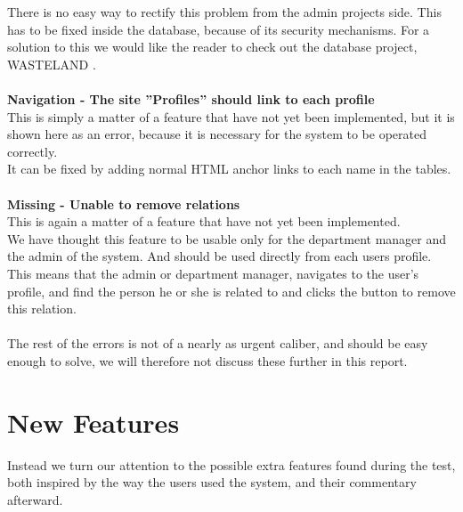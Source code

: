 There is no easy way to rectify this problem from the admin projects side. This has to be fixed inside the database, because of its security mechanisms. For a solution to this we would like the reader to check out the database project, WASTELAND \citep{wasteland}.\\
\\
\textbf{Navigation - The site ''Profiles'' should link to each profile}\\
This is simply a matter of a feature that have not yet been implemented, but it is shown here as an error, because it is necessary for the system to be operated correctly.\\
It can be fixed by adding normal HTML anchor links to each name in the tables.\\
\\
\textbf{Missing - Unable to remove relations}\\
This is again a matter of a feature that have not yet been implemented.\\
We have thought this feature to be usable only for the department manager and the admin of the system. And should be used directly from each users profile. This means that the admin or department manager, navigates to the user's profile, and find the person he or she is related to and clicks the button to remove this relation.\\
\\
The rest of the errors is not of a nearly as urgent caliber, and should be easy enough to solve, we will therefore not discuss these further in this report.\\

\section{New Features}
Instead we turn our attention to the possible extra features found during the test, both inspired by the way the users used the system, and their commentary afterward.\\
\\

